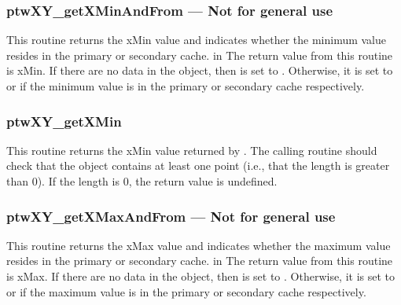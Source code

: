 \subsubsection{ptwXY\_getXMinAndFrom --- Not for general use}
This routine returns the xMin value and indicates whether the minimum value resides in the primary 
or secondary cache.
     in \noindent
The return value from this routine is xMin. If there are no data in the  object, then  is set
to . Otherwise, it is set to  or  if the 
minimum value is in the primary or secondary cache respectively.

\subsubsection{ptwXY\_getXMin}
This routine returns the xMin value returned by . The calling routine should check that the
 object contains at least one point (i.e., that the length is greater than 0). If the length is 0, the return value is
undefined.

\subsubsection{ptwXY\_getXMaxAndFrom --- Not for general use}
This routine returns the xMax value and indicates whether the maximum value resides in the primary or secondary cache.
     in \noindent
The return value from this routine is xMax. If there are no data in the  object, then  is set
to . Otherwise, it is set to  or  if the 
maximum value is in the primary or secondary cache respectively.

